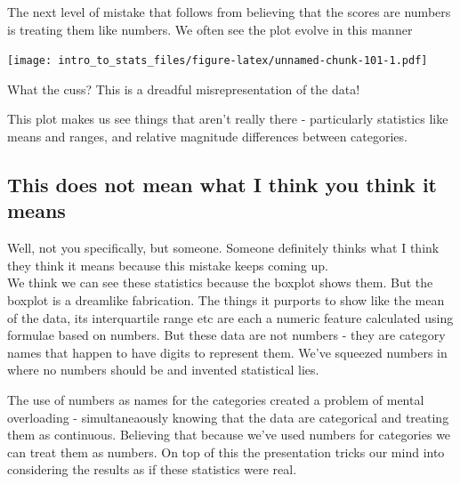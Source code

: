 \documentclass[
]{book}
\newenvironment{Shaded}{\begin{snugshade}}{\end{snugshade}}
\newcommand{\DataTypeTok}[1]{\textcolor[rgb]{0.13,0.29,0.53}{#1}}
\newcommand{\KeywordTok}[1]{\textcolor[rgb]{0.13,0.29,0.53}{\textbf{#1}}}
\newcommand{\NormalTok}[1]{#1}
\newcommand{\OperatorTok}[1]{\textcolor[rgb]{0.81,0.36,0.00}{\textbf{#1}}}
\newcommand{\StringTok}[1]{\textcolor[rgb]{0.31,0.60,0.02}{#1}}
\begin{document}
The next level of mistake that follows from believing that the scores are numbers is treating them like numbers. We often see the plot evolve in this manner

\begin{Shaded}
\end{Shaded}

\texttt{[image: intro\_to\_stats\_files/figure-latex/unnamed-chunk-101-1.pdf]}

What the cuss? This is a dreadful misrepresentation of the data!

This plot makes us see things that aren't really there - particularly statistics like means and ranges, and relative magnitude differences between categories.

\hypertarget{this-does-not-mean-what-i-think-you-think-it-means}{%
\subsection{This does not mean what I think you think it means}\label{this-does-not-mean-what-i-think-you-think-it-means}}

Well, not you specifically, but someone. Someone definitely thinks what I think they think it means because this mistake keeps coming up.\\
We think we can see these statistics because the boxplot shows them. But the boxplot is a dreamlike fabrication. The things it purports to show like the mean of the data, its interquartile range etc are each a numeric feature calculated using formulae based on numbers. But these data are not numbers - they are category names that happen to have digits to represent them. We've squeezed numbers in where no numbers should be and invented statistical lies.

The use of numbers as names for the categories created a problem of mental overloading - simultaneaously knowing that the data are categorical and treating them as continuous. Believing that because we've used numbers for categories we can treat them as numbers. On top of this the presentation tricks our mind into considering the results as if these statistics were real.
\end{document}
